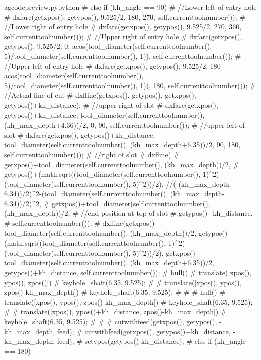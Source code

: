 \documentclass{ltxdoc}
\begin{document}
\begin{writecode}{a}{gcodepreview.py}{python}
{#  } else if (kh_angle == 90) {
#    //Lower left of entry hole
#    dxfarc(getxpos(), getypos(), 9.525/2, 180, 270, self.currenttoolnumber());
#    //Lower right of entry hole
#    dxfarc(getxpos(), getypos(), 9.525/2, 270, 360, self.currenttoolnumber());
#    //Upper right of entry hole
#    dxfarc(getxpos(), getypos(), 9.525/2, 0, acos(tool_diameter(self.currenttoolnumber(), 5)/tool_diameter(self.currenttoolnumber(), 1)), self.currenttoolnumber());
#    //Upper left of entry hole
#    dxfarc(getxpos(), getypos(), 9.525/2, 180-acos(tool_diameter(self.currenttoolnumber(), 5)/tool_diameter(self.currenttoolnumber(), 1)), 180, self.currenttoolnumber());
#    //Actual line of cut
#    dxfline(getxpos(), getypos(), getxpos(), getypos()+kh_distance);
#    //upper right of slot
#    dxfarc(getxpos(), getypos()+kh_distance, tool_diameter(self.currenttoolnumber(), (kh_max_depth+4.36))/2, 0, 90, self.currenttoolnumber());
#    //upper left of slot
#    dxfarc(getxpos(), getypos()+kh_distance, tool_diameter(self.currenttoolnumber(), (kh_max_depth+6.35))/2, 90, 180, self.currenttoolnumber());
#    //right of slot
#    dxfline(
#        getxpos()+tool_diameter(self.currenttoolnumber(), (kh_max_depth))/2, 
#        getypos()+(math.sqrt((tool_diameter(self.currenttoolnumber(), 1)^2)-(tool_diameter(self.currenttoolnumber(), 5)^2))/2), //( (kh_max_depth-6.34))/2)^2-(tool_diameter(self.currenttoolnumber(), (kh_max_depth-6.34))/2)^2, 
#        getxpos()+tool_diameter(self.currenttoolnumber(), (kh_max_depth))/2, 
#    //end position at top of slot
#        getypos()+kh_distance, 
#        self.currenttoolnumber());
#    dxfline(getxpos()-tool_diameter(self.currenttoolnumber(), (kh_max_depth))/2, getypos()+(math.sqrt((tool_diameter(self.currenttoolnumber(), 1)^2)-(tool_diameter(self.currenttoolnumber(), 5)^2))/2), getxpos()-tool_diameter(self.currenttoolnumber(), (kh_max_depth+6.35))/2, getypos()+kh_distance, self.currenttoolnumber());
#    hull(){
#      translate([xpos(), ypos(), zpos()]){
#        keyhole_shaft(6.35, 9.525);
#      }
#      translate([xpos(), ypos(), zpos()-kh_max_depth]){
#        keyhole_shaft(6.35, 9.525);
#      }
#    }
#    hull(){
#      translate([xpos(), ypos(), zpos()-kh_max_depth]){
#        keyhole_shaft(6.35, 9.525);
#      }
#      translate([xpos(), ypos()+kh_distance, zpos()-kh_max_depth]){
#        keyhole_shaft(6.35, 9.525);
#      }
#    }
#    cutwithfeed(getxpos(), getypos(), -kh_max_depth, feed);
#    cutwithfeed(getxpos(), getypos()+kh_distance, -kh_max_depth, feed);
#    setypos(getypos()-kh_distance);
#  } else if (kh_angle == 180) {
}
\end{writecode}
\end{document}
